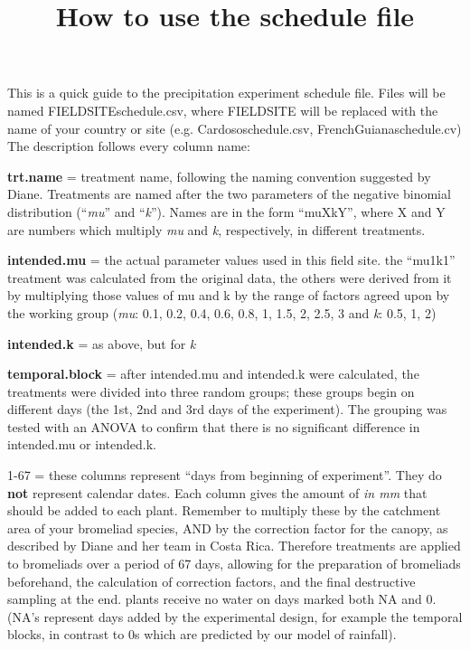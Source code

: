 \message{ !name(how.to.use.schedule.tex)}\documentclass[12pt]{article}
\title{How to use the schedule file}
\begin{document}


\maketitle

This is a quick guide to the precipitation experiment schedule
file. Files will be named FIELDSITEschedule.csv, where FIELDSITE will
be replaced with the name of your country or site
(e.g. Cardososchedule.csv, FrenchGuianaschedule.cv) The description
follows every column name:


\textbf{trt.name} = treatment name, following the naming convention
suggested by Diane.  Treatments are named after the two parameters of
the negative binomial distribution (``\emph{mu}'' and ``\emph{k}'').
Names are in the form ``muXkY'', where X and Y are numbers which
multiply \emph{mu} and \emph{k}, respectively, in different
treatments.

\textbf{intended.mu} = the actual parameter values used in this field site. the
``mu1k1'' treatment was calculated from the original data, the others
were derived from it by multiplying those values of mu and k by the
range of factors agreed upon by the working group (\emph{mu}: 0.1,
0.2, 0.4, 0.6, 0.8, 1, 1.5, 2, 2.5, 3 and \emph{k}: 0.5, 1, 2)

\textbf{intended.k} = as above, but for \emph{k}

\textbf{temporal.block} = after intended.mu and intended.k were
calculated, the treatments were divided into three random groups;
these groups begin on different days (the 1st, 2nd and 3rd days of the
experiment).  The grouping was tested with an ANOVA to confirm that
there is no significant difference in intended.mu or intended.k.

1-67 = these columns represent ``days from beginning of
experiment''. They do \textbf{not} represent calendar dates.  Each
column gives the amount of \emph{in mm} that should be added to each
plant.  Remember to multiply these by the catchment area of your
bromeliad species, AND by the correction factor for the canopy, as
described by Diane and her team in Costa Rica.  Therefore treatments
are applied to bromeliads over a period of 67 days, allowing for the
preparation of bromeliads beforehand, the calculation of correction
factors, and the final destructive sampling at the end.  plants
receive no water on days marked both NA and 0.  (NA's represent days
added by the experimental design, for example the temporal blocks, in
contrast to 0s which are predicted by our model of rainfall).
\end{document}
